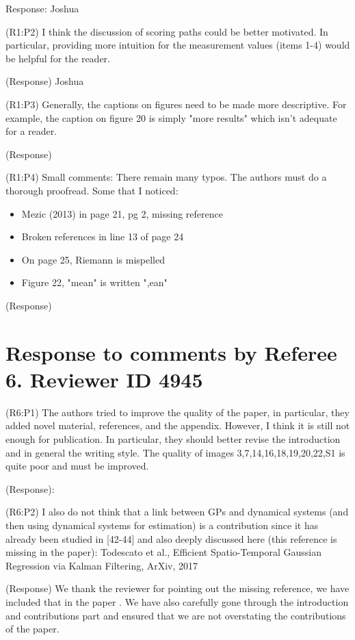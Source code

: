 \documentclass{letter}
\begin{document}
{\color{red} Response:} Joshua


{\color{red}(R1:P2)} I think the discussion of scoring paths could be better motivated. In particular, providing more intuition for the measurement values (items 1-4) would be helpful for the reader. 


{\color{red}(Response)} Joshua

{\color{red}(R1:P3)} Generally, the captions on figures need to be made more descriptive. For example, the caption on figure 20 is simply "more results" which isn't adequate for a reader. 

{\color{red}(Response)} 

{\color{red}(R1:P4)} Small comments: There remain many typos. The authors must do a thorough proofread. Some that I noticed:
\begin{itemize}
	\item Mezic (2013) in page 21, pg 2, missing reference 
	\item Broken references in line 13 of page 24
	\item On page 25, Riemann is mispelled
	\item Figure 22, "mean" is written ",ean"
\end{itemize}

{\color{red}(Response)}



\section{Response to comments by Referee 6. Reviewer ID 4945}

{\color{red}(R6:P1)} The authors tried to improve the quality of the paper, in particular, they added novel material, references, and the appendix. However, I think it is still not enough for publication. In particular, they should better revise the introduction and in general the writing style. The quality of images 3,7,14,16,18,19,20,22,S1 is quite poor and must be improved. 

{\color{red}(Response)}: 


{\color{red}(R6:P2)} I also do not think that a link between GPs and dynamical systems (and then using dynamical systems for estimation) is a contribution since it has already been studied in [42-44] and also deeply discussed here (this reference is missing in the paper): Todescato et al., Efficient Spatio-Temporal Gaussian Regression via Kalman Filtering, ArXiv, 2017

{\color{red}(Response)} We thank the reviewer for pointing out the missing reference, we have included that in the paper . We have also carefully gone through the introduction and contributions part and ensured that we are not overstating the contributions of the paper.
\end{document}
